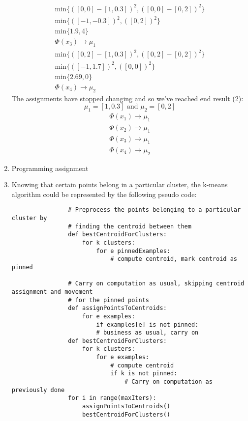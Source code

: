 \documentclass[12pt]{article}
\begin{document}
\begin{enumerate}[label=(\alph*)]
			\begin{gather*}
				\text{min} \{ ( [0,0] - [1, 0.3] )^2, ( [0,0] - [0, 2] )^2\} \\
				\text{min} \{ ( [-1,-0.3] )^2, ( [0, 2] )^2\} \\
				\text{min} \{ 1.9, 4\} \\
				\Phi(x_3) \rightarrow \mu_1
			\end{gather*}
			\begin{gather*}
				\text{min} \{ ( [0,2] - [1, 0.3] )^2, ( [0,2] - [0, 2] )^2\} \\
				\text{min} \{ ( [-1,1.7] )^2, ( [0, 0] )^2\} \\
				\text{min} \{ 2.69, 0\} \\
				\Phi(x_4) \rightarrow \mu_2
			\end{gather*}
			The assignments have stopped changing and so we've reached end result (2):
			\[
				\mu_1 = [1, 0.3] \text{ and } \mu_2 = [0, 2]
			\]
			\begin{gather*}
				\Phi(x_1) \rightarrow \mu_1 \\
				\Phi(x_2) \rightarrow \mu_1 \\
				\Phi(x_3) \rightarrow \mu_1 \\
				\Phi(x_4) \rightarrow \mu_2
			\end{gather*}


		\item Programming assignment
		\item Knowing that certain points belong in a particular cluster, the k-means
			algorithm could be represented by the following pseudo code:

			\begin{verbatim}
				# Preprocess the points belonging to a particular cluster by
				# finding the centroid between them
				def bestCentroidForClusters:
					for k clusters:
						for e pinnedExamples:
							# compute centroid, mark centroid as pinned

				# Carry on computation as usual, skipping centroid assignment and movement
				# for the pinned points
				def assignPointsToCentroids:
					for e examples:
						if examples[e] is not pinned:
						# business as usual, carry on
				def bestCentroidForClusters:
					for k clusters:
						for e examples:
							# compute centroid
							if k is not pinned:
								# Carry on computation as previously done
				for i in range(maxIters):
					assignPointsToCentroids()
					bestCentroidForClusters()
			\end{verbatim}
	\end{enumerate}
\end{document}
